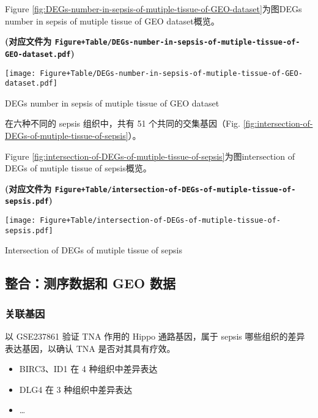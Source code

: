 \documentclass[
]{article}
\providecommand{\tightlist}{%
  \setlength{\itemsep}{0pt}\setlength{\parskip}{0pt}}
\begin{document}
Figure \ref{fig:DEGs-number-in-sepsis-of-mutiple-tissue-of-GEO-dataset}为图DEGs number in sepsis of mutiple tissue of GEO dataset概览。

\textbf{(对应文件为 \texttt{Figure+Table/DEGs-number-in-sepsis-of-mutiple-tissue-of-GEO-dataset.pdf})}

\def\@captype{figure}
\begin{center}
\texttt{[image: Figure+Table/DEGs-number-in-sepsis-of-mutiple-tissue-of-GEO-dataset.pdf]}
\caption{DEGs number in sepsis of mutiple tissue of GEO dataset}\label{fig:DEGs-number-in-sepsis-of-mutiple-tissue-of-GEO-dataset}
\end{center}

在六种不同的 sepsis 组织中，共有 51 个共同的交集基因（Fig. \ref{fig:intersection-of-DEGs-of-mutiple-tissue-of-sepsis}）。

Figure \ref{fig:intersection-of-DEGs-of-mutiple-tissue-of-sepsis}为图intersection of DEGs of mutiple tissue of sepsis概览。

\textbf{(对应文件为 \texttt{Figure+Table/intersection-of-DEGs-of-mutiple-tissue-of-sepsis.pdf})}

\def\@captype{figure}
\begin{center}
\texttt{[image: Figure+Table/intersection-of-DEGs-of-mutiple-tissue-of-sepsis.pdf]}
\caption{Intersection of DEGs of mutiple tissue of sepsis}\label{fig:intersection-of-DEGs-of-mutiple-tissue-of-sepsis}
\end{center}

\hypertarget{ux6574ux5408ux6d4bux5e8fux6570ux636eux548c-geo-ux6570ux636e}{%
\subsection{整合：测序数据和 GEO 数据}\label{ux6574ux5408ux6d4bux5e8fux6570ux636eux548c-geo-ux6570ux636e}}

\hypertarget{ux5173ux8054ux57faux56e0}{%
\subsubsection{关联基因}\label{ux5173ux8054ux57faux56e0}}

以 GSE237861 验证 TNA 作用的 Hippo 通路基因，属于 sepsis 哪些组织的差异表达基因，以确认 TNA 是否对其具有疗效。

\begin{itemize}
\tightlist
\item
  BIRC3、ID1 在 4 种组织中差异表达
\item
  DLG4 在 3 种组织中差异表达
\item
  \ldots{}
\end{itemize}
\end{document}

